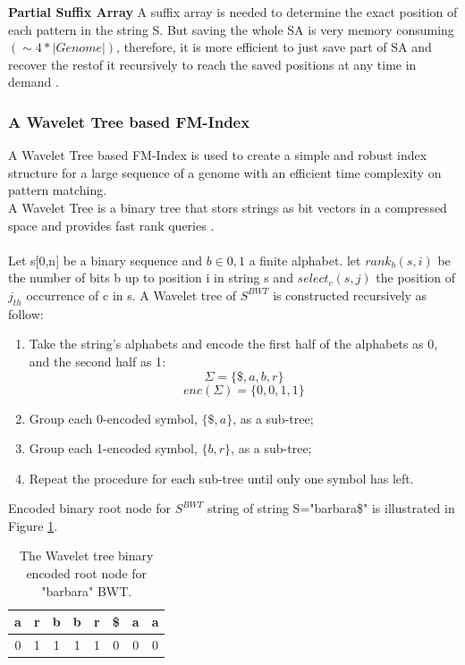 \documentclass[11pt,a4paper]{report}
\begin{document}
\textbf{Partial Suffix Array} A suffix array is needed to determine the 
exact position of each pattern in the string S. But saving the whole SA
is very memory consuming $(\sim 4 * \lvert Genome \rvert)$, therefore, 
it is more efficient to just save part of SA and recover the restof it 
recursively to reach the saved positions at any time in demand 
\cite{Wavthesis}.\\




\subsubsection{A Wavelet Tree based FM-Index}
\label{A Wavelet Tree based FM-Index}


A Wavelet Tree based FM-Index is used to create a simple and robust 
index structure for a large sequence of a genome with an efficient
time complexity on pattern matching.\\
A Wavelet Tree is a binary tree that stors strings as bit vectors in a 
compressed space and provides fast rank queries \cite{navarroWavelet}
\cite{Wavthesis}\cite{AlexBowe}.\\\\
Let s[0,n] be a binary sequence and $b \in {0,1}$ a finite alphabet. 
let $ rank_{b}(s,i)$ be the number of bits b up to position i in string s 
and $ select_{c}(s,j)$  the position of $j_{th}$ occurrence of c in s.
A Wavelet tree of $S^{BWT}$ is constructed recursively as follow:
\begin{enumerate}
    \item
		Take the string's alphabets and encode the first half of the 
		alphabets as 0, and the second half as 1\cite {AlexBowe}:
    		$$\Sigma = \{ \$, a, b, r \}$$
			$$enc(\Sigma) = \{ 0, 0, 1, 1 \}$$
    \item
		Group each 0-encoded symbol, $\{ \$, a \}$, as a sub-tree;
    \item
		Group each 1-encoded symbol, $\{ b , r\}$, as a sub-tree;
    \item
		Repeat the procedure for each sub-tree until only one symbol has left.
\end{enumerate}

Encoded binary root node for $S^{BWT}$ string of string S="barbara\$" 
is illustrated in Figure \ref{binary-root}.
			\begin{table}[h]
			\centering
			  \begin{tabular}{ c c c c c c c c}
				   a  & r & b & b & r & \$ & a & a \\ 
				  \hline
				   0 &	1 &	1 & 1 & 1 & 0 & 0 & 0\\  
				  \hline
			  \end{tabular}
			\caption{The Wavelet tree binary encoded root node for "barbara" BWT.}
			\label{binary-root}
			\end{table}
\end{document}
